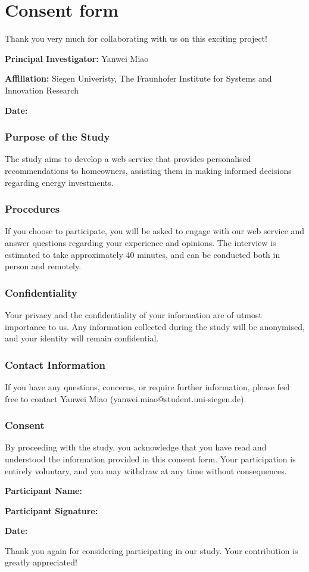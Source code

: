 \clearpage %

\chapter{Consent form}
\label{appendix:consentform}

Thank you very much for collaborating with us on this exciting project!

\textbf{Principal Investigator:} Yanwei Miao

\textbf{Affiliation:} Siegen Univeristy, The Fraunhofer Institute for Systems and Innovation Research

\textbf{Date:}


\subsection*{Purpose of the Study}

The study aims to develop a web service that provides personalised recommendations to homeowners, 
assisting them in making informed decisions regarding energy investments. 


\subsection*{Procedures}

If you choose to participate, you will be asked to engage with our web service and answer questions regarding your experience and opinions. 
The interview is estimated to take approximately 40 minutes, 
and can be conducted both in person and remotely. 


\subsection*{Confidentiality}

Your privacy and the confidentiality of your information are of utmost importance to us. 
Any information collected during the study will be anonymised, and your identity will remain confidential.


\subsection*{Contact Information}

If you have any questions, concerns, or require further information, 
please feel free to contact Yanwei Miao (yanwei.miao@student.uni-siegen.de).


\subsection*{Consent}

By proceeding with the study, you acknowledge that you have read and understood the information provided in this consent form. 
Your participation is entirely voluntary, and you may withdraw at any time without consequences. 


\textbf{Participant Name:}

\textbf{Participant Signature:}

\textbf{Date:} 


Thank you again for considering participating in our study. 
Your contribution is greatly appreciated! 